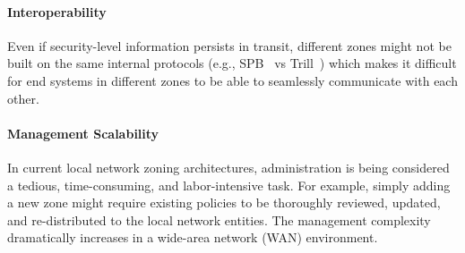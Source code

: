 \paragraph{Interoperability}
Even if security-level information persists in transit, different zones might not be
built on the same internal protocols (e.g., SPB~\cite{ieee2012spb} vs Trill~\cite{rfc6325})
which makes it difficult for end systems in different zones to be able to seamlessly communicate
with each other.

\paragraph{Management Scalability}
In current local network zoning architectures, administration is being considered a tedious,
time-consuming, and labor-intensive task. For example, simply adding a new zone might
require existing policies to be thoroughly reviewed, updated, and re-distributed
to the local network entities. The management complexity dramatically increases in a
wide-area network (WAN) environment.







